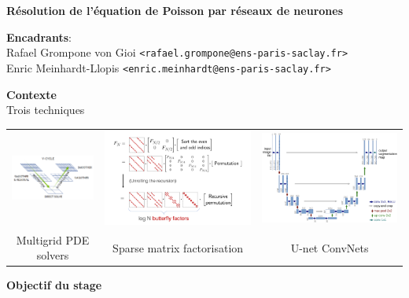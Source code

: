 \documentclass[a4paper,11pt]{article}
\begin{document}
\thispagestyle{empty}

{\bf
	Résolution de l'équation de Poisson par réseaux de neurones
}

{\bf Encadrants}:\\
Rafael Grompone von Gioi \verb+<rafael.grompone@ens-paris-saclay.fr>+\\
Enric Meinhardt-Llopis \verb+<enric.meinhardt@ens-paris-saclay.fr>+ 

{\bf Contexte}\\
Trois techniques

\begin{tabular}{ccc}
	\includegraphics[width=0.32\linewidth]{f/vcycle.png} &
	\includegraphics[width=0.32\linewidth]{f/butterflies.png} &
	\includegraphics[width=0.32\linewidth]{f/cunet.png} \\
	Multigrid PDE solvers&
	Sparse matrix factorisation &
	U-net ConvNets
\end{tabular}


{\bf Objectif du stage}\\

\end{document}
